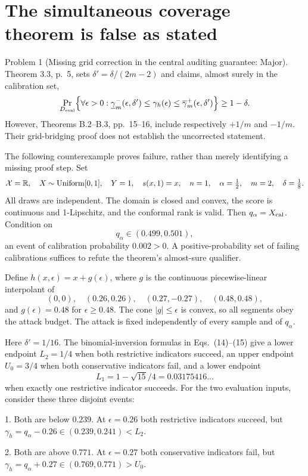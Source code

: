 \documentclass[10pt]{article}
\begin{document}
\section*{The simultaneous coverage theorem is false as stated}
Problem 1 (Missing grid correction in the central auditing guarantee: Major).  Theorem 3.3, p. 5, sets \(\delta'=\delta/(2m-2)\) and claims, almost surely in the calibration set, \[\Pr_{D_{\rm eval}}\!\left\{\forall\epsilon>0:
 \underline\gamma_m^-(\epsilon,\delta')
 \le\gamma_h(\epsilon)
 \le\overline\gamma_m^+(\epsilon,\delta')\right\}\ge1-\delta.\] However, Theorems B.2–B.3, pp. 15–16, include respectively \(+1/m\) and \(-1/m\). Their grid-bridging proof does not establish the uncorrected statement.\par
The following counterexample proves failure, rather than merely identifying a missing proof step. Set \[\mathcal X=\mathbb R,\quad X\sim{\rm Uniform}[0,1],\quad Y=1,\quad
s(x,1)=x,\quad n=1,\quad\alpha=\tfrac12,\quad m=2,\quad\delta=\tfrac18.\] All draws are independent. The domain is closed and convex, the score is continuous and 1-Lipschitz, and the conformal rank is valid. Then \(q_\alpha=X_{\rm cal}\). Condition on \[q_\alpha\in(0.499,0.501),\] an event of calibration probability \(0.002>0\). A positive-probability set of failing calibrations suffices to refute the theorem’s almost-sure qualifier.\par
Define \(h(x,\epsilon)=x+g(\epsilon)\), where \(g\) is the continuous piecewise-linear interpolant of \[(0,0),\quad(0.26,0.26),\quad(0.27,-0.27),\quad(0.48,0.48),\] and \(g(\epsilon)=0.48\) for \(\epsilon\ge0.48\). The cone \(|g|\le\epsilon\) is convex, so all segments obey the attack budget. The attack is fixed independently of every sample and of \(q_\alpha\).\par
Here \(\delta'=1/16\). The binomial-inversion formulas in Eqs. (14)–(15) give a lower endpoint \(L_2=1/4\) when both restrictive indicators succeed, an upper endpoint \(U_0=3/4\) when both conservative indicators fail, and a lower endpoint \[L_1=1-\sqrt{15}/4=0.03175416\ldots\] when exactly one restrictive indicator succeeds. For the two evaluation inputs, consider these three disjoint events:\par
1. Both are below \(0.239\). At \(\epsilon=0.26\) both restrictive indicators succeed, but \(\gamma_h=q_\alpha-0.26\in(0.239,0.241)<L_2\).\par
2. Both are above \(0.771\). At \(\epsilon=0.27\) both conservative indicators fail, but \(\gamma_h=q_\alpha+0.27\in(0.769,0.771)>U_0\).\par
\end{document}
